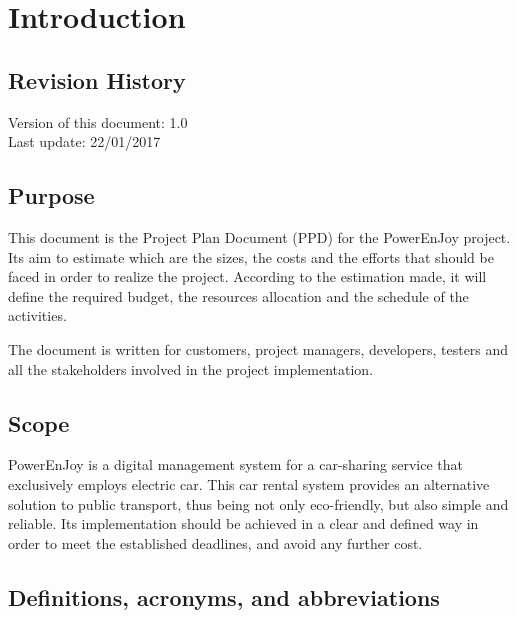 \section{Introduction}

\subsection{Revision History}

Version of this document: 1.0 \\
Last update: 22/01/2017

\subsection{Purpose}

This document is the Project Plan Document (PPD) for the PowerEnJoy project. Its aim to estimate which are the sizes, the costs and the efforts that should be faced in order to realize the project. According to the estimation made, it will define the required budget, the resources allocation and the schedule of the activities.

The document is written for customers, project managers, developers, testers and all the stakeholders involved in the project implementation.

\subsection{Scope}

PowerEnJoy is a digital management system for a car-sharing service that exclusively employs electric car. This car rental system provides an alternative solution to public transport, thus being not only eco-friendly, but also simple and reliable. Its implementation should be achieved in a clear and defined way in order to meet the established deadlines, and avoid any further cost.

\subsection{Definitions, acronyms, and abbreviations}


